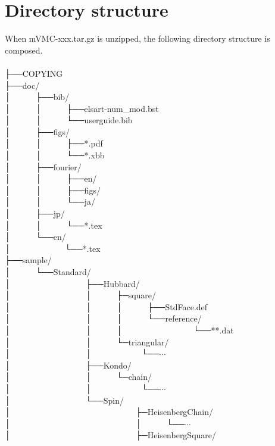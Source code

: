 \section{Directory structure}
When mVMC-xxx.tar.gz is unzipped, the following directory structure is composed.\\
\\
├──COPYING\\
├──doc/\\
│~~~~~~├──bib/\\
│~~~~~~│~~~~~~├──elsart-num\_mod.bst\\
│~~~~~~│~~~~~~└──userguide.bib\\
│~~~~~~├──figs/\\
│~~~~~~│~~~~~~├──*.pdf\\
│~~~~~~│~~~~~~└──*.xbb\\
│~~~~~~├──fourier/\\
│~~~~~~│~~~~~~├──en/\\
│~~~~~~│~~~~~~├──figs/\\
│~~~~~~│~~~~~~└──ja/\\
│~~~~~~├──jp/\\
│~~~~~~│~~~~~~└──*.tex\\
│~~~~~~└──en/\\
│~~~~~~~~~~~~~└──*.tex\\
├──sample/\\
│~~~~~~└──Standard/\\
│~~~~~~~~~~~~~~~~~~├──Hubbard/\\
│~~~~~~~~~~~~~~~~~~│~~~~~~├─square/\\
│~~~~~~~~~~~~~~~~~~│~~~~~~│~~~~~~├──StdFace.def\\
│~~~~~~~~~~~~~~~~~~│~~~~~~│~~~~~~└──reference/\\
│~~~~~~~~~~~~~~~~~~│~~~~~~│~~~~~~~~~~~~~~~~~└──**.dat\\
│~~~~~~~~~~~~~~~~~~│~~~~~~└─triangular/\\
│~~~~~~~~~~~~~~~~~~│~~~~~~~~~~~~└──$\cdots$\\
│~~~~~~~~~~~~~~~~~~├──Kondo/\\
│~~~~~~~~~~~~~~~~~~│~~~~~~└─chain/\\
│~~~~~~~~~~~~~~~~~~│~~~~~~~~~~~~└──$\cdots$\\
│~~~~~~~~~~~~~~~~~~└──Spin/\\
│~~~~~~~~~~~~~~~~~~~~~~~~~~~~~~├─HeisenbergChain/\\
│~~~~~~~~~~~~~~~~~~~~~~~~~~~~~~│~~~~~~└──$\cdots$\\
│~~~~~~~~~~~~~~~~~~~~~~~~~~~~~~├─HeisenbergSquare/\\
